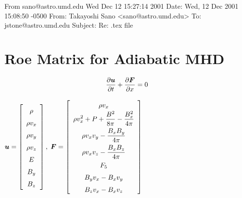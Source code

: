 From sano@astro.umd.edu Wed Dec 12 15:27:14 2001
Date: Wed, 12 Dec 2001 15:08:50 -0500
From: Takayoshi Sano <sano@astro.umd.edu>
To: jstone@astro.umd.edu
Subject: Re: .tex file




\def\undertilde#1{\mathord{\vtop{\ialign{##\crcr
   $\hfil\displaystyle{#1}\hfil$\crcr\noalign{\kern1.5pt\nointerlineskip}
   $\hfil\tilde{}\hfil$\crcr\noalign{\kern1.5pt}}}}}
\def\underwidetilde#1{\mathord{\vtop{\ialign{##\crcr
   $\hfil\displaystyle{#1}\hfil$\crcr\noalign{\kern1.5pt\nointerlineskip}
   $\hfil\widetilde{}\hfil$\crcr\noalign{\kern1.5pt}}}}}



\section{Roe Matrix for Adiabatic MHD}

\begin{equation}
\frac{\partial \mbox{\boldmath $u$}}{\partial t} +
\frac{\partial \mbox{\boldmath $F$}}{\partial x} = 0
\end{equation}

\begin{center}
$\renewcommand{\arraystretch}{1.5}
\mbox{\boldmath $u$} =
\left[
\begin{array}{c}
\rho \\
\rho v_{x} \\
\rho v_{y} \\
\rho v_{z} \\
E \\
B_{y} \\
B_{z} \\
\end{array}
\right], \;
\renewcommand{\arraystretch}{1.5}
\mbox{\boldmath $F$} =
\left[
\begin{array}{c}
\rho v_{x} \\
\displaystyle \rho v_{x}^2 + P + \frac{B^2}{8 \pi} - \frac{B_{x}^2}{4 \pi} 
\vspace{4pt} \\
\displaystyle \rho v_{x} v_{y} -\frac{B_{x}B_{y}}{4 \pi} 
\vspace{4pt} \\
\displaystyle \rho v_{x} v_{z} -\frac{B_{x}B_{z}}{4 \pi} \\
F_5 \\
B_{y} v_{x} - B_{x} v_{y} \\
B_{z} v_{x} - B_{x} v_{z} \\
\end{array}
\right]$\end{center}

